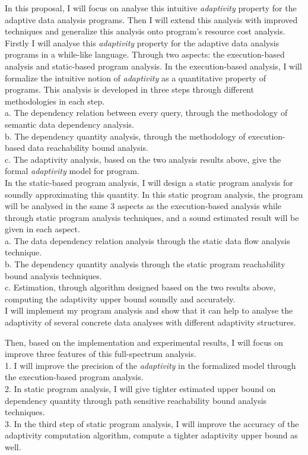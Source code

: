    In this proposal, I will focus on analyse this intuitive \emph{adaptivity} property for the adaptive data analysis programs. 
   Then I will extend this analysis with improved techniques and generalize this analysis onto program's resource cost analysis.
   \\
   Firstly I will analyse this \emph{adaptivity} property for the adaptive data analysis programs in a while-like language.
   Through two aspects: the execution-based analysis and static-based program analysis.
	In the execution-based analysis, I will formalize the intuitive notion of \emph{adaptivity} as a quantitative 
   property of programs. This analysis is developed in three steps through different methodologies in each step. 
   \\
	a. The dependency relation between every query, through the methodology of semantic data dependency analysis.
   \\
	b. The dependency quantity analysis, through the methodology of execution-based data reachability bound analysis.
   \\
	c. The adaptivity analysis, based on the two analysis results above, give the formal \emph{adaptivity} model 
   for program.
   \\   
	In the static-based program analysis, I will design a static program analysis for soundly approximating this quantity.
   In this static program analysis, the program will be analysed in the same 3 aspects as the execution-based analysis 
   while through static program analysis techniques, and a sound estimated result will be given in each aspect.
   \\
	a. The data dependency relation analysis through the static data flow analysis technique.
   \\
	b. The dependency quantity analysis through the static program reachability bound analysis techniques.
   \\
	c. Estimation, through algorithm designed based on the two results above, computing the adaptivity upper bound soundly 
   and accurately.
   \\
   I will implement my program analysis and show that it can help to analyse the adaptivity of several concrete data analyses with different adaptivity structures.

   Then, based on the implementation and experimental results, 
   I will focus on improve three features of this full-spectrum analysis.
   \\
   1. I will improve the precision of the \emph{adaptivity} in the formalized model through the execution-based program analysis.
   \\
   2. In static program analysis, I will give tighter estimated upper bound on dependency quantity through 
   path sensitive reachability bound analysis techniques. 
   \\
   3. In the third step of static program analysis, I will improve the accuracy of the adaptivity computation algorithm,
   compute a tighter adaptivity upper bound as well.
   
